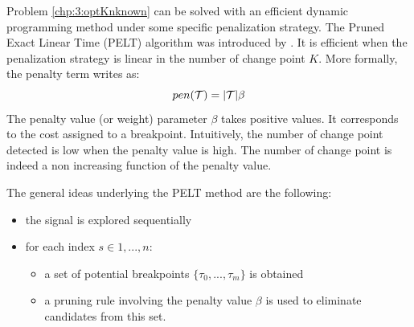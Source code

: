 Problem \eqref{chp:3:optKnknown} can be solved with an efficient dynamic programming method under some specific penalization strategy. The Pruned Exact Linear Time (PELT) algorithm was introduced by \cite{Killick2012}. It is efficient when the penalization strategy is linear in the number of change point $K$. More formally, the penalty term writes as:
$$pen({\mathcal T}) = \lvert{\mathcal T}\rvert\beta$$ 
The penalty value (or weight) parameter $\beta$ takes positive values. It corresponds to the cost assigned to a breakpoint. Intuitively, the number of change point detected is low when the penalty value is high. The number of change point is indeed a non increasing function of the penalty value. 


The general ideas underlying the PELT method are the following:
\begin{itemize}
\item the signal is explored sequentially 
\item for each index $s \in {1,...,n}$:
\begin{itemize}
\item a set of potential breakpoints $\{\tau_0,...,\tau_m\}$ is obtained
\item a pruning rule involving the penalty value $\beta$ is used to eliminate candidates from this set.
\end{itemize}
\end{itemize}

